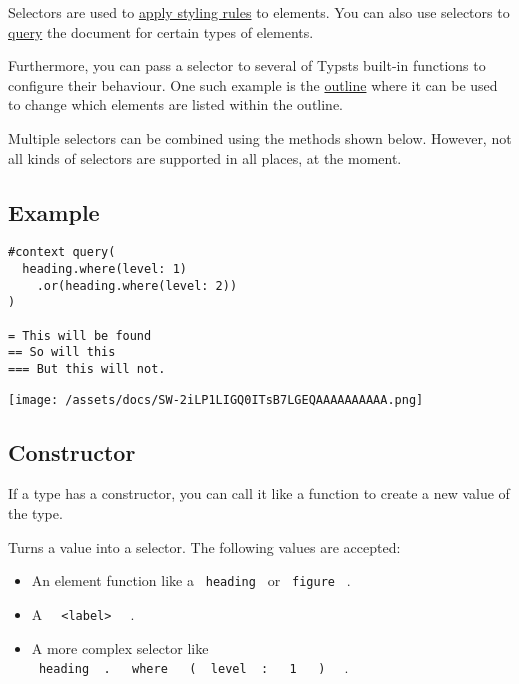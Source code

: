 Selectors are used to \href{/docs/reference/styling/\#show-rules}{apply
styling rules} to elements. You can also use selectors to
\href{/docs/reference/introspection/query/}{query} the document for
certain types of elements.

Furthermore, you can pass a selector to several of
Typst\textquotesingle s built-in functions to configure their behaviour.
One such example is the \href{/docs/reference/model/outline/}{outline}
where it can be used to change which elements are listed within the
outline.

Multiple selectors can be combined using the methods shown below.
However, not all kinds of selectors are supported in all places, at the
moment.

\subsection{Example}\label{example}

\begin{verbatim}
#context query(
  heading.where(level: 1)
    .or(heading.where(level: 2))
)

= This will be found
== So will this
=== But this will not.
\end{verbatim}

\texttt{[image: /assets/docs/SW-2iLP1LIGQ0ITsB7LGEQAAAAAAAAAA.png]}

\subsection{\texorpdfstring{Constructor
{}}{Constructor }}\label{constructor}

\label{constructor-constructor-tooltip}
If a type has a constructor, you can call it like a function to create a
new value of the type.

Turns a value into a selector. The following values are accepted:

\begin{itemize}
\tightlist
\item
  An element function like a \texttt{\ heading\ } or \texttt{\ figure\ }
  .
\item
  A \texttt{\ }{\texttt{\ \textless{}label\textgreater{}\ }}\texttt{\ }
  .
\item
  A more complex selector like
  \texttt{\ heading\ }{\texttt{\ .\ }}\texttt{\ }{\texttt{\ where\ }}\texttt{\ }{\texttt{\ (\ }}\texttt{\ level\ }{\texttt{\ :\ }}\texttt{\ }{\texttt{\ 1\ }}\texttt{\ }{\texttt{\ )\ }}\texttt{\ }
  .
\end{itemize}

